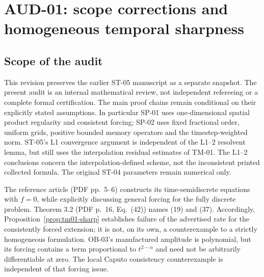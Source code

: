\documentclass[11pt,a4paper]{amsart}
\theoremstyle{remark}
\theoremstyle{plain}
\theoremstyle{remark}
\numberwithin{equation}{section}
\begin{document}
\section{AUD-01: scope corrections and homogeneous temporal sharpness}
\label{sec:aud01}

\subsection{Scope of the audit}
This revision preserves the earlier ST-05 manuscript as a separate snapshot. The present audit is an internal mathematical review, not independent refereeing or a complete formal certification. The main proof chains remain conditional on their explicitly stated assumptions. In particular SP-01 uses one-dimensional spatial product regularity and consistent forcing; SP-02 uses fixed fractional order, uniform grids, positive bounded memory operators and the timestep-weighted norm. ST-05's L1 convergence argument is independent of the L1--2 resolvent lemma, but still uses the interpolation residual estimates of TM-01. The L1--2 conclusions concern the interpolation-defined scheme, not the inconsistent printed collected formula. The original ST-04 parameters remain numerical only.

The reference article (PDF pp.~5--6) constructs its time-semidiscrete equations with $f=0$, while explicitly discussing general forcing for the fully discrete problem. Theorem 3.2 (PDF p.~16, Eq.~(42)) names (19) and (37). Accordingly, Proposition~\ref{prop:tm01-sharp} establishes failure of the advertised rate for the consistently forced extension; it is not, on its own, a counterexample to a strictly homogeneous formulation. OB-03's manufactured amplitude is polynomial, but its forcing contains a term proportional to $t^{2-\alpha}$ and need not be arbitrarily differentiable at zero. The local Caputo consistency counterexample is independent of that forcing issue.
\end{document}
